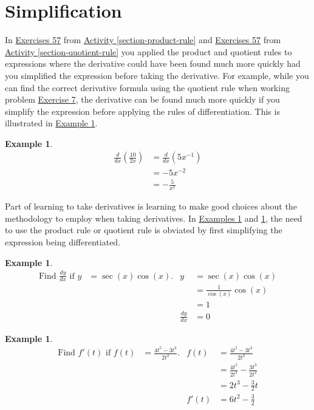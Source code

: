 \documentclass[12pt,]{book}
\theoremstyle{plain}
\theoremstyle{definition}
\newtheorem{example}[theorem]{Example}
\numberwithin{equation}{section}
\newcommand{\fe}[2]{#1\mathopen{}\left(#2\right)\mathclose{}}
\newcommand{\fd}[1]{#1'}
\newcommand{\lz}[2]{\frac{d#1}{d#2}}
\newcommand{\lzoo}[2]{{\frac{d}{d#1}}{\left(#2\right)}}
\begin{document}
\section[Simplification]{Simplification}\label{section-simplification}
In \hyperlink{unsimplified-product-first}{Exercises 5}\textendash{}\hyperlink{unsimplified-product-last}{7} from \hyperref[section-product-rule]{Activity \ref{section-product-rule}} and \hyperlink{unsimplified-quotient-first}{Exercises 5}\textendash{}\hyperlink{unsimplified-quotient-last}{7} from \hyperref[section-quotient-rule]{Activity \ref{section-quotient-rule}} you applied the product and quotient rules to expressions where the derivative could have been found much more quickly had you simplified the expression before taking the derivative.  For example, while you can find the correct derivative formula using the quotient rule when working problem \hyperlink{unsimplified-quotient-last}{Exercise 7}, the derivative can be found much more quickly if you simplify the expression before applying the rules of differentiation. This is illustrated in \hyperref[example-simplify-first]{Example \ref{example-simplify-first}}.%
\begin{example}\label{example-simplify-first}
\begin{align*}
\lzoo{x}{\frac{10}{2x}}&=\lzoo{x}{5x^{-1}}\\
&=-5x^{-2}\\
&=-\frac{5}{x^{2}}
\end{align*}%
\end{example}
\par
Part of learning to take derivatives is learning  to make good choices about the methodology to employ when taking derivatives.  In \hyperref[example-simplify-second]{Examples \ref{example-simplify-second}} and \hyperref[example-simplify-third]{\ref{example-simplify-third}}, the need to use the product rule or quotient rule is obviated by first simplifying the expression being differentiated.%
\begin{example}\label{example-simplify-second}
\begin{align*}
\text{Find }\lz{y}{x}\text{ if }y&=\fe{\sec}{x}\fe{\cos}{x}\text{.}&y&=\fe{\sec}{x}\fe{\cos}{x}\\
&&&=\frac{1}{\fe{\cos}{x}}\fe{\cos}{x}\\
&&&=1\\
&&\lz{y}{x}&=0
\end{align*}%
\end{example}
\begin{example}\label{example-simplify-third}
\begin{align*}
\text{Find }\fe{\fd{f}}{t}\text{ if }\fe{f}{t}&=\frac{4t^5-3t^3}{2t^2}\text{.}&\fe{f}{t}&=\frac{4t^5-3t^3}{2t^2}\\
&&&=\frac{4t^5}{2t^2}-\frac{3t^3}{2t^2}\\
&&&=2t^3-\frac{3}{2}t\\
&&\fe{\fd{f}}{t}&=6t^2-\frac{3}{2}
\end{align*}%
\end{example}
\typeout{************************************************}
\typeout{************************************************}
\end{document}
